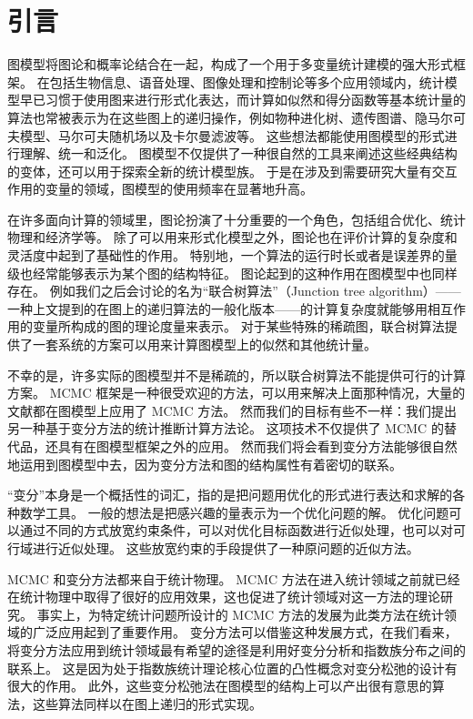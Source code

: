 \chapter{引言}

图模型将图论和概率论结合在一起，构成了一个用于多变量统计建模的强大形式框架。
在包括生物信息、语音处理、图像处理和控制论等多个应用领域内，统计模型早已习惯于使用图来进行形式化表达，而计算如似然和得分函数等基本统计量的算法也常被表示为在这些图上的递归操作，例如物种进化树、遗传图谱、隐马尔可夫模型、马尔可夫随机场以及卡尔曼滤波等。
这些想法都能使用图模型的形式进行理解、统一和泛化。
图模型不仅提供了一种很自然的工具来阐述这些经典结构的变体，还可以用于探索全新的统计模型族。
于是在涉及到需要研究大量有交互作用的变量的领域，图模型的使用频率在显著地升高。

在许多面向计算的领域里，图论扮演了十分重要的一个角色，包括组合优化、统计物理和经济学等。
除了可以用来形式化模型之外，图论也在评价计算的复杂度和灵活度中起到了基础性的作用。
特别地，一个算法的运行时长或者是误差界的量级也经常能够表示为某个图的结构特征。
图论起到的这种作用在图模型中也同样存在。
例如我们之后会讨论的名为“联合树算法”（Junction tree algorithm）——一种上文提到的在图上的递归算法的一般化版本——的计算复杂度就能够用相互作用的变量所构成的图的理论度量来表示。
对于某些特殊的稀疏图，联合树算法提供了一套系统的方案可以用来计算图模型上的似然和其他统计量。

不幸的是，许多实际的图模型并不是稀疏的，所以联合树算法不能提供可行的计算方案。
MCMC 框架是一种很受欢迎的方法，可以用来解决上面那种情况，大量的文献都在图模型上应用了 MCMC 方法。
然而我们的目标有些不一样：我们提出另一种基于变分方法的统计推断计算方法论。
这项技术不仅提供了 MCMC 的替代品，还具有在图模型框架之外的应用。
然而我们将会看到变分方法能够很自然地运用到图模型中去，因为变分方法和图的结构属性有着密切的联系。

“变分”本身是一个概括性的词汇，指的是把问题用优化的形式进行表达和求解的各种数学工具。
一般的想法是把感兴趣的量表示为一个优化问题的解。
优化问题可以通过不同的方式放宽约束条件，可以对优化目标函数进行近似处理，也可以对可行域进行近似处理。
这些放宽约束的手段提供了一种原问题的近似方法。

MCMC 和变分方法都来自于统计物理。
MCMC 方法在进入统计领域之前就已经在统计物理中取得了很好的应用效果，这也促进了统计领域对这一方法的理论研究。
事实上，为特定统计问题所设计的 MCMC 方法的发展为此类方法在统计领域的广泛应用起到了重要作用。
变分方法可以借鉴这种发展方式，在我们看来，将变分方法应用到统计领域最有希望的途径是利用好变分分析和指数族分布之间的联系上。
这是因为处于指数族统计理论核心位置的凸性概念对变分松弛的设计有很大的作用。
此外，这些变分松弛法在图模型的结构上可以产出很有意思的算法，这些算法同样以在图上递归的形式实现。

